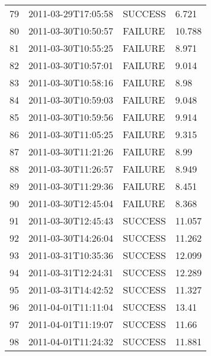 \begin{tabularx}{\textwidth}{p{1cm} p{3cm} p{2cm} X}
 79 & 2011-03-29T17:05:58 & SUCCESS & 6.721 \\
 80 & 2011-03-30T10:50:57 & FAILURE & 10.788 \\
 81 & 2011-03-30T10:55:25 & FAILURE & 8.971 \\
 82 & 2011-03-30T10:57:01 & FAILURE & 9.014 \\
 83 & 2011-03-30T10:58:16 & FAILURE & 8.98 \\
 84 & 2011-03-30T10:59:03 & FAILURE & 9.048 \\
 85 & 2011-03-30T10:59:56 & FAILURE & 9.914 \\
 86 & 2011-03-30T11:05:25 & FAILURE & 9.315 \\
 87 & 2011-03-30T11:21:26 & FAILURE & 8.99 \\
 88 & 2011-03-30T11:26:57 & FAILURE & 8.949 \\
 89 & 2011-03-30T11:29:36 & FAILURE & 8.451 \\
 90 & 2011-03-30T12:45:04 & FAILURE & 8.368 \\
 91 & 2011-03-30T12:45:43 & SUCCESS & 11.057 \\
 92 & 2011-03-30T14:26:04 & SUCCESS & 11.262 \\
 93 & 2011-03-31T10:35:36 & SUCCESS & 12.099 \\
 94 & 2011-03-31T12:24:31 & SUCCESS & 12.289 \\
 95 & 2011-03-31T14:42:52 & SUCCESS & 11.327 \\
 96 & 2011-04-01T11:11:04 & SUCCESS & 13.41 \\
 97 & 2011-04-01T11:19:07 & SUCCESS & 11.66 \\
 98 & 2011-04-01T11:24:32 & SUCCESS & 11.881 \\
 \bottomrule
\end{tabularx}
\newpage

